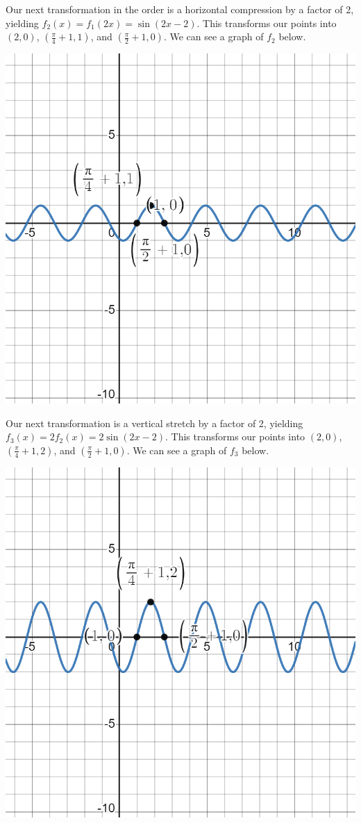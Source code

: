 \documentclass{ximera}
\begin{document}
\begin{example}
\begin{explanation}
Our next transformation in the order is a horizontal compression by a factor of 2, yielding $f_2(x) = f_1(2x) = \sin(2x - 2)$. This transforms our points into $(2, 0)$, $\left(\frac{\pi}{4} + 1, 1 \right)$, and $\left(\frac{\pi}{2} + 1, 0\right)$.  We can see a graph of $f_2$ below.
\begin{image}
\includegraphics[width=0.8\linewidth]{images/graph-2-ex2.png}
\end{image}

Our next transformation is a vertical stretch by a factor of 2, yielding $f_3(x) = 2f_2(x) = 2\sin(2x - 2)$. This transforms our points into $(2, 0)$, $\left(\frac{\pi}{4} + 1, 2 \right)$, and $\left(\frac{\pi}{2} + 1, 0\right)$.  We can see a graph of $f_3$ below.
\begin{image}
\includegraphics[width=0.8\linewidth]{images/graph-2-ex3.png}
\end{image}


\end{explanation}
\end{example}
\end{document}
